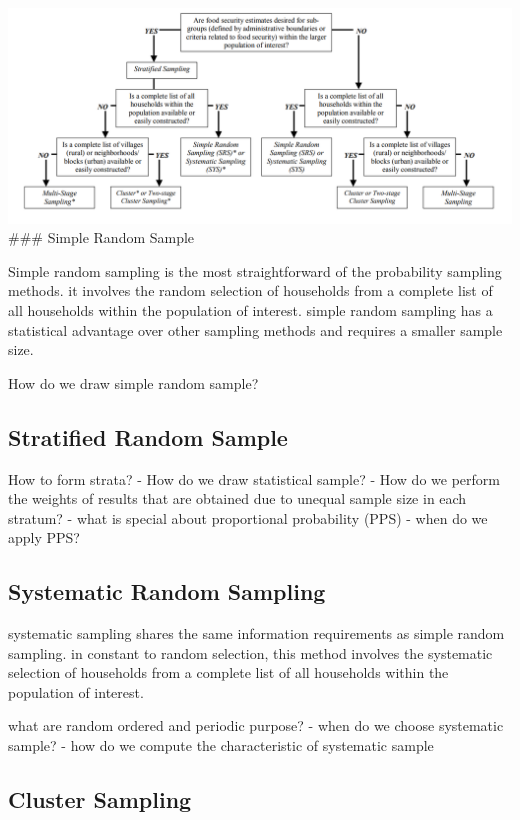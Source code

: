 \documentclass[
  letterpaper,
  DIV=11,
  numbers=noendperiod]{scrreprt}
\begin{document}
\includegraphics[width=1\linewidth,height=\textheight,keepaspectratio]{assets/Choosing_SamplingMethod.png}
\#\#\# Simple Random Sample

Simple random sampling is the most straightforward of the probability
sampling methods. it involves the random selection of households from a
complete list of all households within the population of interest.
simple random sampling has a statistical advantage over other sampling
methods and requires a smaller sample size.

How do we draw simple random sample?

\subsection{Stratified Random Sample}\label{stratified-random-sample}

How to form strata? - How do we draw statistical sample? - How do we
perform the weights of results that are obtained due to unequal sample
size in each stratum? - what is special about proportional probability
(PPS) - when do we apply PPS?

\subsection{Systematic Random
Sampling}\label{systematic-random-sampling}

systematic sampling shares the same information requirements as simple
random sampling. in constant to random selection, this method involves
the systematic selection of households from a complete list of all
households within the population of interest.

what are random ordered and periodic purpose? - when do we choose
systematic sample? - how do we compute the characteristic of systematic
sample

\subsection{Cluster Sampling}\label{cluster-sampling}
\end{document}

